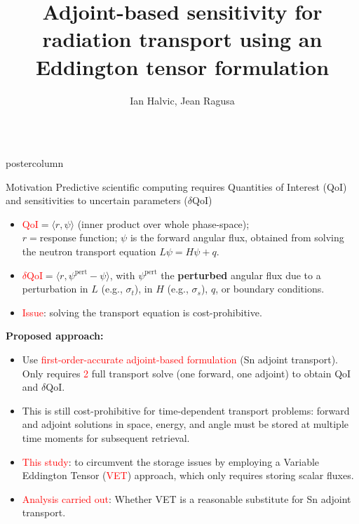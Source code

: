 \documentclass[xcolor={usenames,dvipsnames,svgnames,table}]{beamer}
\title[<short>]{Adjoint-based sensitivity for radiation transport using an Eddington tensor formulation}
\author[<short>]{Ian Halvic, Jean Ragusa}
\institute{Department of Nuclear Engineering, Texas A\&M University, College Station, TX, USA 77843}
\newcommand{\tcr}[1]{\textcolor{red}{#1}}
\newlength{\columnheight}
\begin{document}
\begin{frame}
	\begin{columns}

	\begin{column}{.33\textwidth}
		\begin{beamercolorbox}[center,wd=\textwidth]{postercolumn}
			\begin{minipage}[T]{0.95\textwidth} %
			\parbox[t][\columnheight]{\textwidth}{ %

			    \begin{block}{Motivation}
					Predictive scientific computing requires Quantities of Interest (QoI) and sensitivities to uncertain parameters ($\delta$QoI) 
					\begin{itemize}
					\item \tcr{QoI}$=\langle r, \psi \rangle$ (inner product over whole phase-space);\\ $r=$response function; $\psi$ is the forward angular flux, obtained from solving the neutron transport equation $L \psi = H\psi +q$.
					\item \tcr{$\delta$QoI}$=\langle r, \psi^{\text{pert}}-\psi \rangle$, with $\psi^{\text{pert}}$ the {\bf perturbed} angular flux due to a perturbation in $L$ (e.g., $\sigma_t$), in $H$ (e.g., $\sigma_s$), $q$, or boundary conditions.
					\item \tcr{Issue}: solving the transport equation is cost-prohibitive.
					\end{itemize}
					\vspace{1cm}
{\bf Proposed approach:}
\begin{itemize}
  \item Use \tcr{first-order-accurate adjoint-based formulation} (Sn adjoint transport).\\
	Only requires \tcr{2} full transport solve (one forward, one adjoint) to obtain QoI and $\delta$QoI.
	\item This is still cost-prohibitive for time-dependent transport problems: forward and adjoint solutions in space, energy, and angle must be stored at multiple time moments for subsequent retrieval.
	\item \tcr{This study}: to circumvent the storage issues by employing a Variable Eddington Tensor (\tcr{VET}) approach, which only requires storing scalar fluxes.
	\item \tcr{Analysis carried out}: Whether VET is a reasonable substitute for Sn adjoint transport.
\end{itemize}


\end{block}}
\end{minipage}
\end{beamercolorbox}
\end{column}
\end{columns}
\end{frame}
\end{document}
